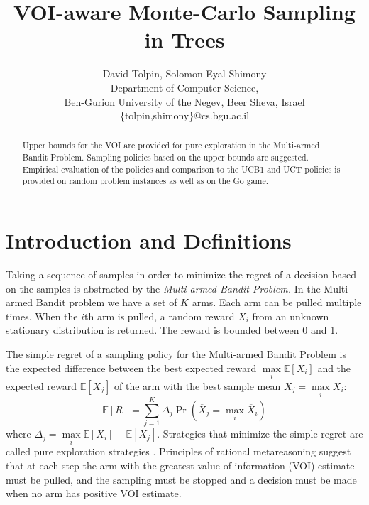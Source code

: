 \documentclass{article}
\title{VOI-aware Monte-Carlo Sampling in Trees}
\author {David Tolpin, Solomon Eyal Shimony \\
Department of Computer Science, \\
Ben-Gurion University of the Negev, Beer Sheva, Israel \\
\{tolpin,shimony\}@cs.bgu.ac.il}
\newcommand {\IE} {\ensuremath {\mathbb{E}}}
\begin{document}
\maketitle

\begin{abstract}
Upper bounds for the VOI are provided for pure exploration in the
Multi-armed Bandit Problem. Sampling policies based on the upper
bounds are suggested. Empirical evaluation of the policies and
comparison to the UCB1 and UCT policies is provided
on random problem instances as well as on the Go game.
\end{abstract}


\section{Introduction and Definitions}

Taking a sequence of samples in order to minimize the
regret of a decision based on the samples is abstracted by the
{\em Multi-armed Bandit Problem.} In the Multi-armed Bandit problem
we have a set of $K$ arms. Each arm can be pulled multiple
times. When the $i$th arm is pulled, a random reward $X_i$ from an
unknown stationary distribution is returned.  The reward is bounded
between 0 and 1.

The simple regret of a sampling policy for the Multi-armed Bandit
Problem is the expected difference between the best expected reward
$\max\limits_i\IE[X_i]$ and the expected reward $\IE[X_j]$ of the arm
with the best sample mean $\overline X_j=\max\limits_i\overline X_i$:
\begin{equation}
\label{eqn:simple-regret}
\IE[R]=\sum_{j=1}^K\Delta_j\Pr(\overline X_j=\max_i\overline X_i)
\end{equation}
where $\Delta_j=\max\limits_i\IE[X_i]-\IE[X_j]$.  Strategies that
minimize the simple regret are called pure exploration strategies
\cite{Bubeck.pure}. Principles of rational metareasoning
\cite{Russell.right} suggest that at each step the arm with the
greatest value of information (VOI) estimate must be pulled, and the
sampling must be stopped and a decision must be made when no arm has
positive VOI estimate.
\end{document}
